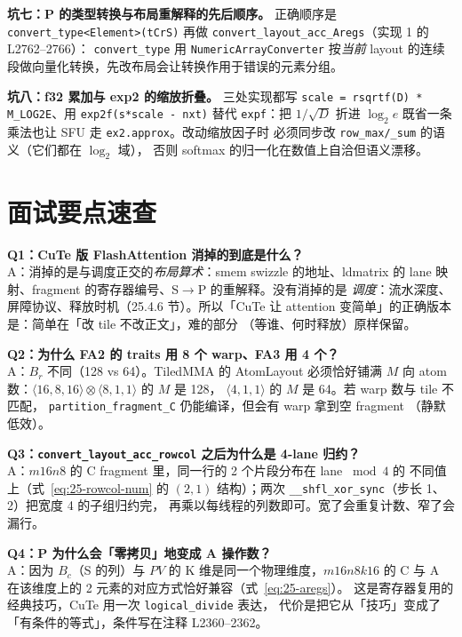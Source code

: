 \textbf{坑七：P 的类型转换与布局重解释的先后顺序。}
正确顺序是 \texttt{convert\_\allowbreak{}type\allowbreak{}<Element>\allowbreak{}(t\allowbreak{}Cr\allowbreak{}S)} 再做
\texttt{convert\_\allowbreak{}layout\_\allowbreak{}acc\_\allowbreak{}Aregs}（实现 1 的 L2762--2766）：
\texttt{convert\_\allowbreak{}type} 用 \texttt{Numeric\allowbreak{}Array\allowbreak{}Converter} 按\emph{当前}
layout 的连续段做向量化转换，先改布局会让转换作用于错误的元素分组。

\textbf{坑八：f32 累加与 exp2 的缩放折叠。}
三处实现都写 \texttt{scale = rsqrtf(D) * M\_LOG2E}、用
\texttt{exp2f\allowbreak{}(s*scale - nxt)} 替代 \texttt{expf}：把 $1/\sqrt{D}$ 折进
$\log_2 e$ 既省一条乘法也让 SFU 走 \texttt{ex2.approx}。改动缩放因子时
必须同步改 \texttt{row\_\allowbreak{}max/\allowbreak{}\_\allowbreak{}sum} 的语义（它们都在 $\log_2$ 域），
否则 softmax 的归一化在数值上自洽但语义漂移。

\section{面试要点速查}

\textbf{Q1：CuTe 版 FlashAttention 消掉的到底是什么？}\\
A：消掉的是与调度正交的\emph{布局算术}：smem swizzle 的地址、ldmatrix 的
lane 映射、fragment 的寄存器编号、S$\to$P 的重解释。没有消掉的是
\emph{调度}：流水深度、屏障协议、释放时机（25.4.6 节）。所以「CuTe 让
attention 变简单」的正确版本是：简单在「改 tile 不改正文」，难的部分
（等谁、何时释放）原样保留。

\textbf{Q2：为什么 FA2 的 traits 用 8 个 warp、FA3 用 4 个？}\\
A：$B_r$ 不同（128 vs 64）。TiledMMA 的 AtomLayout 必须恰好铺满 $M$ 向
atom 数：$\langle16,8,16\rangle\otimes\langle8,1,1\rangle$ 的 $M$ 是 128，
$\langle4,1,1\rangle$ 的 $M$ 是 64。若 warp 数与 tile 不匹配，
\texttt{partition\_\allowbreak{}fragment\_\allowbreak{}C} 仍能编译，但会有 warp 拿到空 fragment
（静默低效）。

\textbf{Q3：\texttt{convert\_\allowbreak{}layout\_\allowbreak{}acc\_\allowbreak{}rowcol} 之后为什么是 4-lane 归约？}\\
A：$m16n8$ 的 C fragment 里，同一行的 2 个片段分布在 lane $\bmod 4$ 的
不同值上（式~\eqref{eq:25-rowcol-num} 的 $(2,1)$ 结构）；两次
\texttt{\_\allowbreak{}\_\allowbreak{}shfl\_\allowbreak{}xor\_\allowbreak{}sync}（步长 1、2）把宽度 4 的子组归约完，
再乘以每线程的列数即可。宽了会重复计数、窄了会漏行。

\textbf{Q4：P 为什么会「零拷贝」地变成 A 操作数？}\\
A：因为 $B_c$（S 的列）与 $PV$ 的 K 维是同一个物理维度，$m16n8k16$ 的
C 与 A 在该维度上的 2 元素的对应方式恰好兼容（式~\eqref{eq:25-aregs}）。
这是寄存器复用的经典技巧，CuTe 用一次 \texttt{logical\_\allowbreak{}divide} 表达，
代价是把它从「技巧」变成了「有条件的等式」，条件写在注释 L2360--2362。

